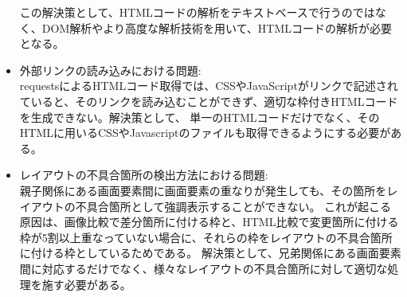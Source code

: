 \begin{itemize}
          この解決策として、HTMLコードの解析をテキストベースで行うのではなく、DOM解析やより高度な解析技術を用いて、HTMLコードの解析が必要となる。
    \item 外部リンクの読み込みにおける問題:\\
          requestsによるHTMLコード取得では、CSSやJavaScriptがリンクで記述されていると、そのリンクを読み込むことができず、適切な枠付きHTMLコードを生成できない。解決策として、
          単一のHTMLコードだけでなく、そのHTMLに用いるCSSやJavascriptのファイルも取得できるようにする必要がある。
    \item レイアウトの不具合箇所の検出方法における問題:\\
          親子関係にある画面要素間に画面要素の重なりが発生しても、その箇所をレイアウトの不具合箇所として強調表示することができない。
          これが起こる原因は、画像比較で差分箇所に付ける枠と、HTML比較で変更箇所に付ける枠が5割以上重なっていない場合に、それらの枠をレイアウトの不具合箇所に付ける枠としているためである。
          解決策として、兄弟関係にある画面要素間に対応するだけでなく、様々なレイアウトの不具合箇所に対して適切な処理を施す必要がある。
\end{itemize}
